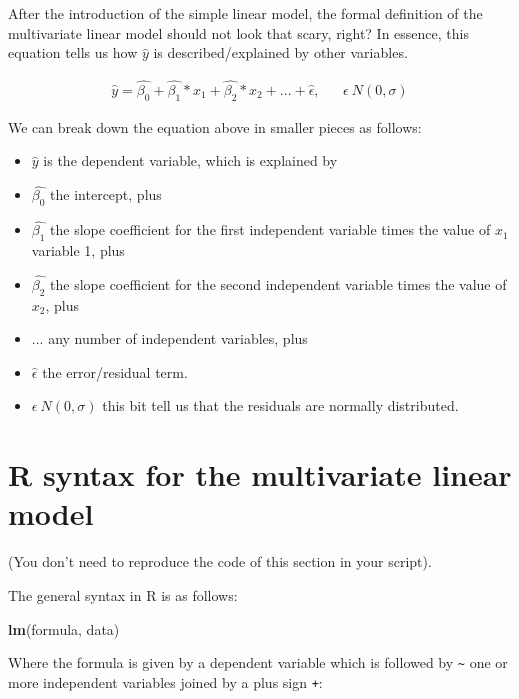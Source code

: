 \documentclass[
]{book}
\newenvironment{Shaded}{\begin{snugshade}}{\end{snugshade}}
\newcommand{\FunctionTok}[1]{\textcolor[rgb]{0.13,0.29,0.53}{\textbf{#1}}}
\newcommand{\NormalTok}[1]{#1}
\providecommand{\tightlist}{%
  \setlength{\itemsep}{0pt}\setlength{\parskip}{0pt}}
\begin{document}
After the introduction of the simple linear model, the formal definition of the multivariate linear model should not look that scary, right? In essence, this equation tells us how \(\hat{y}\) is described/explained by other variables.

\[
\begin{aligned}
\hat{y} = \hat{\beta_0} + \hat{\beta_1}*x_1 + \hat{\beta_2}*x_2 + ... +  \hat{\epsilon}, && \epsilon ~ N(0, \sigma)  
\end{aligned}
\]

We can break down the equation above in smaller pieces as follows:

\begin{itemize}
\tightlist
\item
  \(\hat{y}\) is the dependent variable, which is explained by
\item
  \(\hat{\beta_0}\) the intercept, plus
\item
  \(\hat{\beta_1}\) the slope coefficient for the first independent variable times the value of \(x_1\) variable 1, plus
\item
  \(\hat{\beta_2}\) the slope coefficient for the second independent variable times the value of \(x_2\), plus
\item
  \(...\) any number of independent variables, plus
\item
  \(\hat{\epsilon}\) the error/residual term.
\item
  \(\epsilon ~ N(0, \sigma)\) this bit tell us that the residuals are normally distributed.
\end{itemize}

\hypertarget{r-syntax-for-the-multivariate-linear-model}{%
\section{R syntax for the multivariate linear model}\label{r-syntax-for-the-multivariate-linear-model}}

(You don't need to reproduce the code of this section in your script).

The general syntax in R is as follows:

\begin{Shaded}
\begin{Highlighting}[]
\FunctionTok{lm}\NormalTok{(formula, data)}
\end{Highlighting}
\end{Shaded}

Where the formula is given by a dependent variable which is followed by \texttt{\textasciitilde{}} one or more independent variables joined by a plus sign \texttt{+}:
\end{document}
